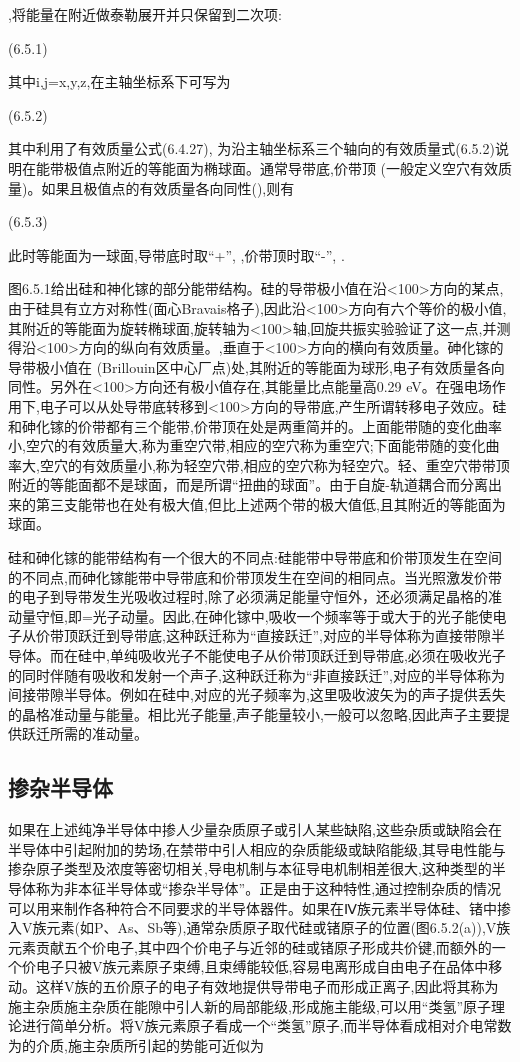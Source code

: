 ,将能量在附近做泰勒展开并只保留到二次项:

	 (6.5.1)

其中i,j=x,y,z,在主轴坐标系下可写为

 	(6.5.2)

其中利用了有效质量公式(6.4.27), 为沿主轴坐标系三个轴向的有效质量式(6.5.2)说明在能带极值点附近的等能面为椭球面。通常导带底,价带顶 (一般定义空穴有效质量)。如果且极值点的有效质量各向同性(),则有

 	(6.5.3)

此时等能面为一球面,导带底时取“+”, ,价带顶时取“-”, .

图6.5.1给出硅和神化镓的部分能带结构。硅的导带极小值在沿<100>方向的某点,由于硅具有立方对称性(面心Bravais格子),因此沿<100>方向有六个等价的极小值,其附近的等能面为旋转椭球面,旋转轴为<100>轴,回旋共振实验验证了这一点,并测得沿<100>方向的纵向有效质量。,垂直于<100>方向的横向有效质量。砷化镓的导带极小值在 (Brillouin区中心厂点)处,其附近的等能面为球形,电子有效质量各向同性。另外在<100>方向还有极小值存在,其能量比点能量高0.29 eV。在强电场作用下,电子可以从处导带底转移到<100>方向的导带底,产生所谓转移电子效应。硅和砷化镓的价带都有三个能带,价带顶在处是两重简并的。上面能带随的变化曲率小,空穴的有效质量大,称为重空穴带,相应的空穴称为重空穴;下面能带随的变化曲率大,空穴的有效质量小,称为轻空穴带,相应的空穴称为轻空穴。轻、重空穴带带顶附近的等能面都不是球面，而是所谓“扭曲的球面”。由于自旋-轨道耦合而分离出来的第三支能带也在处有极大值,但比上述两个带的极大值低,且其附近的等能面为球面。

硅和砷化镓的能带结构有一个很大的不同点:硅能带中导带底和价带顶发生在空间的不同点,而砷化镓能带中导带底和价带顶发生在空间的相同点。当光照激发价带的电子到导带发生光吸收过程时,除了必须满足能量守恒外，还必须满足晶格的准动量守恒,即=光子动量。因此,在砷化镓中,吸收一个频率等于或大于的光子能使电子从价带顶跃迁到导带底,这种跃迁称为“直接跃迁”,对应的半导体称为直接带隙半导体。而在硅中,单纯吸收光子不能使电子从价带顶跃迁到导带底,必须在吸收光子的同时伴随有吸收和发射一个声子,这种跃迁称为“非直接跃迁”,对应的半导体称为间接带隙半导体。例如在硅中,对应的光子频率为,这里吸收波矢为的声子提供丢失的晶格准动量与能量。相比光子能量,声子能量较小,一般可以忽略,因此声子主要提供跃迁所需的准动量。



\subsection{掺杂半导体}

如果在上述纯净半导体中掺人少量杂质原子或引人某些缺陷,这些杂质或缺陷会在半导体中引起附加的势场,在禁带中引人相应的杂质能级或缺陷能级,其导电性能与掺杂原子类型及浓度等密切相关,导电机制与本征导电机制相差很大,这种类型的半导体称为非本征半导体或“掺杂半导体”。正是由于这种特性,通过控制杂质的情况可以用来制作各种符合不同要求的半导体器件。如果在Ⅳ族元素半导体硅、锗中掺入V族元素(如P、As、Sb等),通常杂质原子取代硅或锗原子的位置(图6.5.2(a)),V族元素贡献五个价电子,其中四个价电子与近邻的硅或锗原子形成共价键,而额外的一个价电子只被V族元素原子束缚,且束缚能较低,容易电离形成自由电子在品体中移动。这样V族的五价原子的电子有效地提供导带电子而形成正离子,因此将其称为施主杂质施主杂质在能隙中引人新的局部能级,形成施主能级,可以用“类氢”原子理论进行简单分析。将V族元素原子看成一个“类氢”原子,而半导体看成相对介电常数为的介质,施主杂质所引起的势能可近似为

